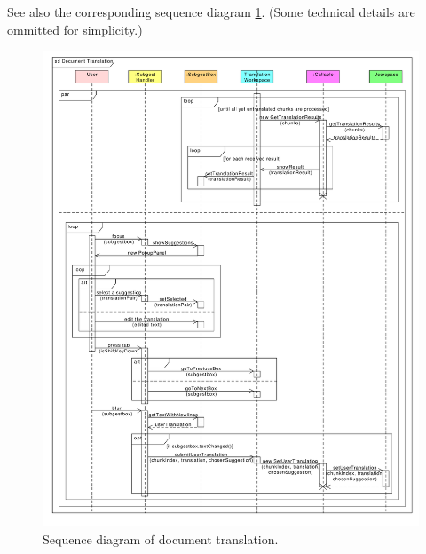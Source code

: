 See also the corresponding sequence diagram \ref{gui:sd:document_translation}.
(Some technical details are ommitted for simplicity.)

\begin{figure}[h]
\begin{center}
\includegraphics[scale=0.45]{figures/document_translation_sequence.pdf}
\end{center}
\caption{Sequence diagram of document translation.}\label{gui:sd:document_translation}
\end{figure}
